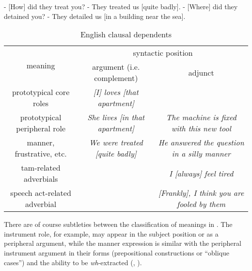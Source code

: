 \documentclass[UTF8, a4paper, oneside, scheme=plain]{ctexrep}
\newcommand{\corpus}[1]{\emph{#1}}
\begin{document}
\begin{exe}
    \ex\label{ex:simple-clause.dependents.ex-1} - [How] did they treat you? - They treated us [quite badly].
    \ex\label{ex:simple-clause.dependents.ex-2} - [Where] did they detained you? - They detailed us [in a building near the sea].
\end{exe}

\begin{table}[H]
    \caption{English clausal dependents}
    \label{tbl:clausal-dependent}
    \begin{tabular}{ccc}
    \toprule
    \multirow{2}{*}{meaning}      & \multicolumn{2}{c}{syntactic position}                                                       \\ \cmidrule{2-3}
                                  & argument (i.e. complement)                             & adjunct                                             \\ \midrule
    prototypical core roles       & \cellcolor[HTML]{32CB00}\corpus{[I] loves [that apartment]}             & \\ 
    prototypical peripheral role  & \cellcolor[HTML]{34FF34}\corpus{She lives [in that apartment]} & \cellcolor[HTML]{34CDF9}\corpus{The machine is fixed with this new tool}    \\
    manner, frustrative, etc.     & \cellcolor[HTML]{DAE8FC}\cellcolor[HTML]{67FD9A}\corpus{We were treated [quite badly]} & \cellcolor[HTML]{DAE8FC}\corpus{He answered the question in a silly manner} \\
    \acs{tam}-related adverbials &                                        & \cellcolor[HTML]{ECF4FF}\corpus{I [always] feel tired}                      \\
    speech act-related adverbial  &                                        & \corpus{[Frankly], I think you are fooled by them} \\ \bottomrule
    \end{tabular}
\end{table}

There are of course subtleties between the classification of meanings in .
The instrument role, for example, 
may appear in the subject position or as a peripheral argument, 
while the manner expression is similar with the peripheral instrument argument 
in their forms (prepositional constructions or ``oblique cases'')
and the ability to be \corpus{wh}-extracted
(, ).
\end{document}
